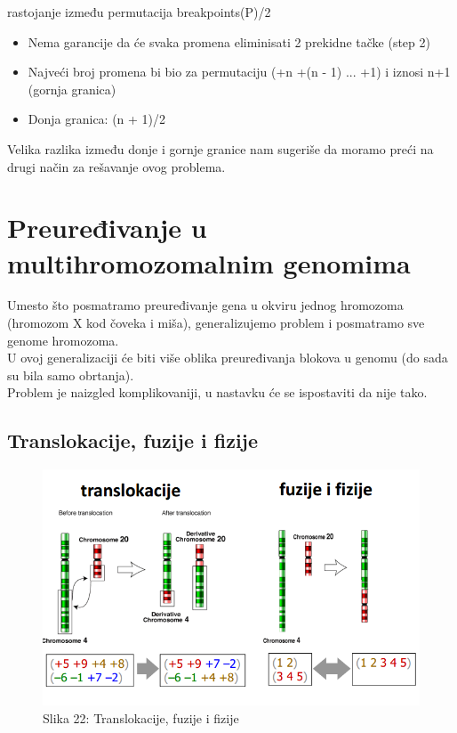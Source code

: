 \documentclass{article}
\begin{document}
\hspace{0.5cm} rastojanje između permutacija \geq breakpoints(P)/2\\

\newpage

\begin{itemize}
\item{Nema garancije da će svaka promena eliminisati 2 prekidne tačke (step 2)}

\item{Najveći broj promena bi bio za permutaciju (+n +(n - 1) ... +1) i iznosi n+1 (gornja granica)}

\item{Donja granica: (n + 1)/2}
\end{itemize}

\noindent Velika razlika između donje i gornje granice nam sugeriše da moramo preći na drugi način za rešavanje ovog problema.

\section{Preuređivanje u multihromozomalnim genomima}

Umesto što posmatramo preuređivanje gena u okviru
jednog hromozoma (hromozom X kod čoveka i miša),
generalizujemo problem i posmatramo sve genome
hromozoma.\\

U ovoj generalizaciji će biti više oblika
preuređivanja blokova u genomu (do sada su bila
samo obrtanja).\\

Problem je naizgled komplikovaniji, u nastavku će
se ispostaviti da nije tako.\\

\subsection{Translokacije, fuzije i fizije}

\begin{figure}[h!]
\centering
\includegraphics[scale=0.45]{slike/preuredjivanja.PNG}
\caption{Slika 22: Translokacije, fuzije i fizije}
\label{slika:X}
\end{figure}
\end{document}
